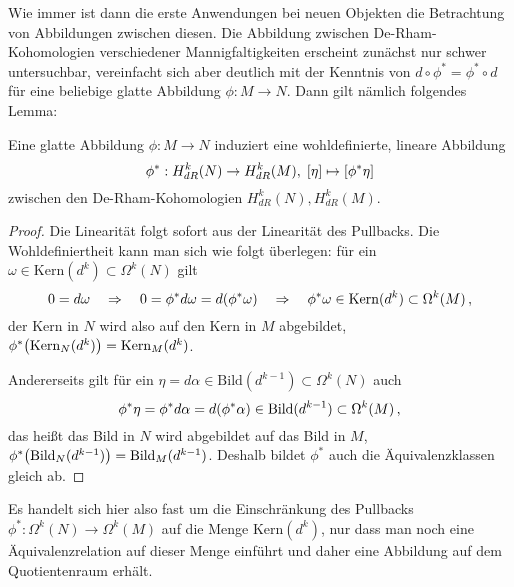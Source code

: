 \documentclass[../H_Analysis_main.tex]{subfiles}
\begin{document}
Wie immer ist dann die erste Anwendungen bei neuen Objekten die Betrachtung von Abbildungen zwischen diesen. Die Abbildung zwischen De-Rham-Kohomologien verschiedener Mannigfaltigkeiten erscheint zunächst nur schwer untersuchbar, vereinfacht sich aber deutlich mit der Kenntnis von $d \circ \phi^* = \phi^* \circ d$ für eine beliebige glatte Abbildung $\phi: M \rightarrow N$. Dann gilt nämlich folgendes Lemma:
\begin{lemma}
Eine glatte Abbildung $\phi: M \rightarrow N$ induziert eine wohldefinierte, lineare Abbildung
\begin{equation}
\phi^*: H_{dR}^k(N) \rightarrow H_{dR}^k(M), \; [\eta] \mapsto \qty[\phi^* \eta]
\end{equation}
zwischen den De-Rham-Kohomologien $H_{dR}^k(N), H_{dR}^k(M)$.
\end{lemma}
\begin{proof}
Die Linearität folgt sofort aus der Linearität des Pullbacks. Die Wohldefiniertheit kann man sich wie folgt überlegen: für ein $\omega \in \text{Kern}(d^k) \subset \Omega^k(N)$ gilt
\begin{equation*}
0 = d\omega \quad \Rightarrow \quad 0 = \phi^* d\omega = d \qty(\phi^* \omega) \quad \Rightarrow \quad \phi^*\omega \in \text{Kern}(d^k) \subset \Omega^k(M) \, ,
\end{equation*}
der Kern in $N$ wird also auf den Kern in $M$ abgebildet, $\phi^* \qty(\text{Kern}_N(d^k)) = \text{Kern}_M(d^k)$.

Andererseits gilt für ein $\eta = d\alpha \in \text{Bild}(d^{k - 1}) \subset \Omega^k(N)$ auch
\begin{equation*}
\phi^* \eta = \phi^* d\alpha = d\qty(\phi^*\alpha) \in \text{Bild}(d^{k - 1}) \subset \Omega^k(M) \, ,
\end{equation*}
das heißt das Bild in $N$ wird abgebildet auf das Bild in $M$, $\phi^* \qty(\text{Bild}_N(d^{k - 1})) = \text{Bild}_M(d^{k - 1})$. Deshalb bildet $\phi^*$ auch die Äquivalenzklassen gleich ab.
\end{proof}
Es handelt sich hier also fast um die Einschränkung des Pullbacks $\phi^*: \Omega^k(N) \rightarrow \Omega^k(M)$ auf die Menge $\text{Kern}(d^k)$, nur dass man noch eine Äquivalenzrelation auf dieser Menge einführt und daher eine Abbildung auf dem Quotientenraum erhält.
\end{document}
